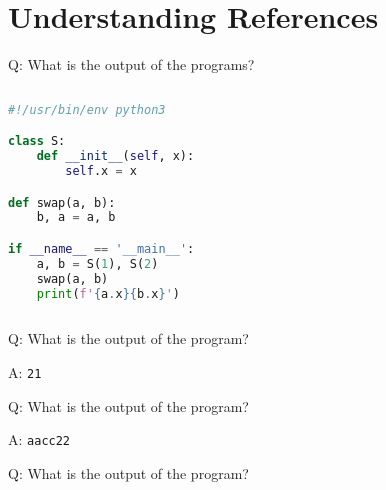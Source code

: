 \begin{frame}
    \centering
    \scalebox{3}{Understanding References}
\end{frame}

\section{Understanding References}

\begin{frame}[fragile]{Q: What is the output of the programs?}
    \begin{columns}[t]
        \begin{column}{.45\textwidth}

    \begin{lstlisting}[language=python]
#!/usr/bin/env python3

class S:
    def __init__(self, x):
        self.x = x

def swap(a, b):
    b, a = a, b

if __name__ == '__main__':
    a, b = S(1), S(2)
    swap(a, b)
    print(f'{a.x}{b.x}')
    \end{lstlisting}
        \end{column}
        \begin{column}{.45\textwidth}

        \end{column}
    \end{columns}
\end{frame}

\begin{frame}[fragile]{Q: What is the output of the program?}
\end{frame}

\begin{frame}[fragile]{A: \texttt{21}}
\end{frame}

\begin{frame}[fragile]{Q: What is the output of the program?}
\end{frame}

\begin{frame}[fragile]{A: \texttt{aacc22}}
\end{frame}

\begin{frame}[fragile]{Q: What is the output of the program?}
\end{frame}

